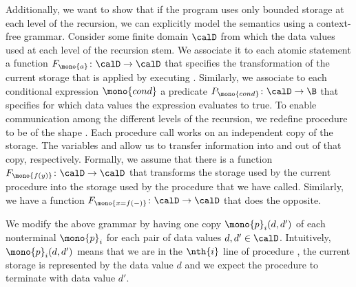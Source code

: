 \documentclass[../../diss.tex]{subfiles}
\begin{document}
Additionally, we want to show that if the program uses only bounded storage at each level of the recursion, we can explicitly model the semantics using a context-free grammar.
Consider some finite domain $\domain$ from which the data values used at each level of the recursion stem.
We associate it to each atomic statement  a function $F_{\mono{a}} \colon \domain \to \domain$ that specifies the transformation of the current storage that is applied by executing .
Similarly, we associate to each conditional expression $\mono{cond}$ a predicate $P_{\mono{cond}} \colon \domain \to \B$ that specifies for which data values the expression evaluates to true.
To enable communication among the different levels of the recursion, we redefine procedure to be of the shape .
Each procedure call works on an independent copy of the storage.
The variables  and  allow us to transfer information into and out of that copy, respectively.
Formally, we assume that there is a function $F_{\mono{f(y)}} \colon \domain \to \domain$ that transforms the storage used by the current procedure into the storage used by the procedure  that we have called.
Similarly, we have a function $F_{\mono{x = f(-)}} \colon \domain \to \domain$ that does the opposite.

We modify the above grammar by having one copy $\mono{p}_{i}(d,d')$ of each nonterminal $\mono{p}_{i}$ for each pair of data values $d,d' \in \domain$.
Intuitively, $\mono{p}_{i}(d,d')$ means that we are in the $\nth{i}$ line of procedure , the current storage is represented by the data value $d$ and we expect the procedure to terminate with data value $d'$.
\end{document}
